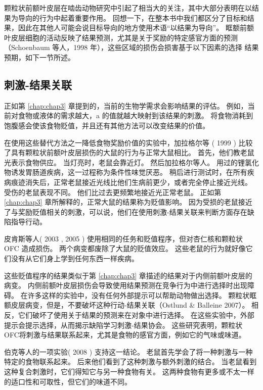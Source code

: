 颗粒状前额叶皮层在啮齿动物研究中引起了相当大的关注，其中大部分表明在以结果为导向的行为中起着重要作用。
回想一下，在整本书中我们都区分了目标和结果，因此在其他人可能会说目标导向的地方使用术语“以结果为导向”。
眶额前额叶皮层细胞的活动反映了结果预测，尤其是关于奖励的特定感官方面的预测（Schoenbaum 等人，1998 年），这些区域的损伤会损害基于以下因素的选择
结果预期，如下一节所述。



\subsection{刺激-结果关联}

正如第 \ref{chap:chap3} 章提到的，当前的生物学需求会影响结果的评估。
例如，当前对食物或液体的需求越大，a 的值就越大映射到该结果的刺激。
将食物消耗到饱腹感会使该食物贬值，并且还有其他方法可以改变结果的价值。\par


在使用这些替代方法之一降低食物奖励价值的实验中，加拉格尔等 ( 1999 ) 比较了具有颗粒状前额叶皮层损伤的大鼠的行为与正常大鼠相比。
首先，他们教老鼠光表示食物供应。
当灯亮时，老鼠会靠近灯。
然后加拉格尔等人。
用过的锂氯化物诱发胃肠道疾病，这一过程称为条件性味觉厌恶。
稍后进行测试时，在所有疾病痕迹消失后，正常老鼠接近光线比他们生病前更少，或者完全停止接近光线。
受伤的老鼠表现不同。
他们比过去更频繁地接近光正常老鼠。
正如第 \ref{chap:chap3} 章所解释的，正常大鼠的结果称为贬值影响。
因为受损的老鼠接近了与奖励贬值相关的刺激，可以说，他们在使用刺激-结果关联来判断方面存在缺陷指导行动。\par


皮肯斯等人( 2003 , 2005 ) 使用相同的任务和贬值程序，但对杏仁核和颗粒状 OFC 造成损伤。
两个病变都废除了大鼠的贬值效应。
这些老鼠的行为就好像它们没有从它们身上学到任何东西一样疾病。\par


这些贬值程序的结果类似于第 \ref{chap:chap3} 章描述的结果对于内侧前额叶皮层的病变。
内侧前额叶皮层损伤会导致使用结果预测在竞争行为中进行选择时出现障碍。
在许多这样的实验中，没有任何外部提示可以帮助动物做出选择。
颗粒状眶额皮层病变，但是，不要破坏这种行动-结果关联（Ostlund \& Balleine 2007）。
相反，它们破坏了使用关于结果的预测来在对象中进行选择。
在这些实验中，外部提示会提示选择，从而揭示缺陷学习刺激-结果协会。
这些研究表明，颗粒状 OFC将刺激与结果联系起来，尤其是食物的感官方面，例如它的气味或味道。\par


伯克等人的一项实验( 2008 ) 支持这一结论。
老鼠首先学会了将一种刺激与一种特定的食物联系起来。 后来他们看到了这种刺激与额外刺激的结合。
当老鼠看到这种复合刺激时，它们得知它与另一种食物有关。
这两种食物有更多或不太一样的适口性和可取性，但它们的味道不同。\par


